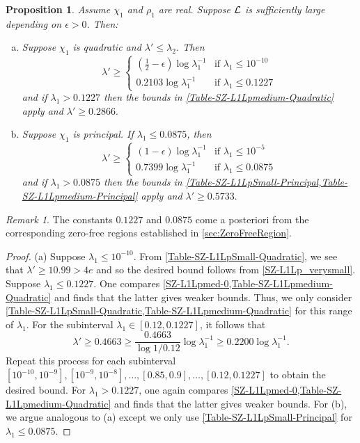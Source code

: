 \documentclass[12pt,psamsfonts]{amsart}
\newtheorem{prop}[thm]{Proposition}
\theoremstyle{definition}
\theoremstyle{remark}
\newtheorem*{rem*}{Remark}
\numberwithin{equation}{section}
\begin{document}
\begin{prop}  \label{SZ-L1Lp-Summary} Assume $\chi_1$ and $\rho_1$ are real. Suppose $\mathcal{L}$ is sufficiently large depending on $\epsilon  > 0$. Then:
\begin{enumerate}[(a)]
	\item Suppose $\chi_1$ is quadratic and $\lambda' \leq \lambda_2$. Then
	\[
	\lambda' \geq 
	\begin{cases}
	(\tfrac{1}{2}-\epsilon) \log \lambda_1^{-1} & \text{if $\lambda_1 \leq 10^{-10}$}  \\
	0.2103 \log \lambda_1^{-1} & \text{if $\lambda_1 \leq 0.1227$}
	\end{cases}
	\]
	and if $\lambda_1 > 0.1227$ then the bounds in \cref{Table-SZ-L1Lpmedium-Quadratic} apply and $\lambda' \geq 0.2866.$
	\item Suppose $\chi_1$ is principal. If $\lambda_1 \leq 0.0875$, then 
	\[
	\lambda' \geq 
	\begin{cases}
	(1-\epsilon) \log \lambda_1^{-1} & \text{if $\lambda_1 \leq 10^{-5}$}  \\
	0.7399 \log \lambda_1^{-1} & \text{if $\lambda_1 \leq 0.0875$}
	\end{cases}
	\]
	and if $\lambda_1 > 0.0875$ then the bounds in \cref{Table-SZ-L1LpSmall-Principal,Table-SZ-L1Lpmedium-Principal} apply and 	$\lambda' \geq 0.5733. $
\end{enumerate}
\end{prop}
\begin{rem*} The constants $0.1227$ and $0.0875$ come a posteriori from the corresponding zero-free regions established in \cref{sec:ZeroFreeRegion}. 
\end{rem*}
\begin{proof} (a) Suppose $\lambda_1 \leq 10^{-10}$. From \cref{Table-SZ-L1LpSmall-Quadratic}, we see that $\lambda' \geq 10.99 > 4e$ and so the desired bound follows from \cref{SZ-L1Lp_verysmall}.  Suppose $\lambda_1 \leq 0.1227$. One compares \cref{SZ-L1Lpmed-0,Table-SZ-L1Lpmedium-Quadratic} and finds that the latter gives weaker bounds.  Thus, we only consider  \cref{Table-SZ-L1LpSmall-Quadratic,Table-SZ-L1Lpmedium-Quadratic} for this range of $\lambda_1$. For the subinterval $\lambda_1 \in [0.12, 0.1227]$, it follows that
\[
\lambda' \geq 0.4663 \geq  \frac{0.4663}{\log 1/0.12} \log \lambda_1^{-1} \geq 0.2200 \log \lambda_1^{-1}.
\]
Repeat this process for each subinterval $[10^{-10}, 10^{-9}], [10^{-9}, 10^{-8}], \dots, [0.85,0.9], \dots, [0.12, 0.1227]$ to obtain the desired bound. For $\lambda_1 > 0.1227$, one again compares \cref{SZ-L1Lpmed-0,Table-SZ-L1Lpmedium-Quadratic} and finds that the latter gives weaker bounds. For (b), we argue analogous to (a) except we only use \cref{Table-SZ-L1LpSmall-Principal} for $\lambda_1 \leq 0.0875$. 
\end{proof}
\end{document}
